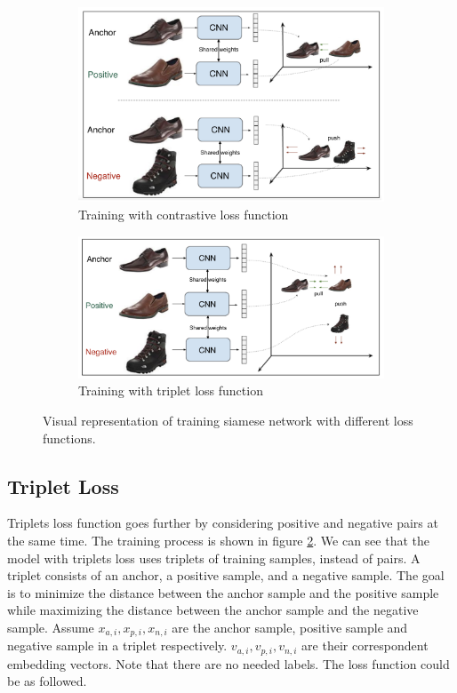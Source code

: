 \begin{figure}[h]
  \centering
  \begin{subfigure}[b]{\linewidth}
  \includegraphics[width=\linewidth]{figs/contrastive.png}
  \caption{Training with contrastive loss function}
  \label{fig:contrastive}
  \end{subfigure}
  \hfill
    \begin{subfigure}[b]{\linewidth}
   \includegraphics[width=\linewidth]{figs/triplet.png}
   \caption{Training with triplet loss function}
   \label{fig:triplet}
  \end{subfigure}
  \hfill
    \caption{Visual representation of training siamese network with different loss functions.}
    \label{fig:sialoss}
\end{figure}

\subsection{Triplet Loss}

Triplets loss function goes further by considering positive and negative pairs at the same time. The training process is shown in figure \ref{fig:triplet}. We can see that the model with triplets loss uses triplets of training samples, instead of pairs. A triplet consists of an anchor, a positive sample, and a negative sample. The goal is to minimize the distance between the anchor sample and the positive sample while maximizing the distance between the anchor sample and the negative sample. Assume $x_{a,i}, x_{p,i}, x_{n,i}$ are the anchor sample, positive sample and negative sample in a triplet respectively. $v_{a,i}, v_{p,i}, v_{n,i}$ are their correspondent embedding vectors. Note that there are no needed labels. The loss function could be as followed. 

